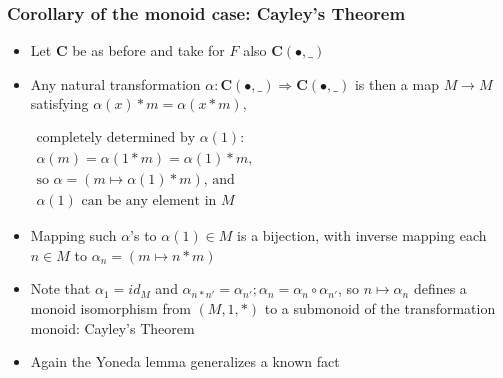 \documentclass[handout]{beamer}
\newcommand{\To}{\Rightarrow}
\newcommand{\bfsf}[1]{{\boldsymbol{#1}}}
\newcommand{\CC}{\bfsf{C}}
\begin{document}
\frame
  {   
    \frametitle{Corollary of the monoid case: Cayley's Theorem}\label{Yon:MonCayley}

 \begin{itemize}[<+->]
\item Let $\CC$ be as before and take for $F$ also $\CC(\bullet,\_)$
\item Any natural transformation $\alpha: \CC(\bullet,\_)\To \CC(\bullet,\_)$ is
then a map $M\to M$ satisfying $\alpha(x)*m = \alpha(x*m)$,
$\begin{array}{l}%
\text{completely determined by $\alpha(1)$:}\\
\text{$\alpha(m) = \alpha(1*m)   = \alpha(1)*m$,}\\
\text{so $\alpha = (m\mapsto \alpha(1)*m)$, and}\\ %
\text{$\alpha(1)$ can be any element in $M$}
\end{array}$
\item Mapping such $\alpha$'s to $\alpha(1)\in M$ is a bijection, with inverse
mapping each $n\in M$ to $\alpha_n = (m\mapsto n*m)$ %
\item Note that $\alpha_1 = id_M$ and 
$\alpha_{n*n'} = \alpha_{n'};\alpha_n= \alpha_n\circ\alpha_{n'}$, so
$n\mapsto\alpha_n$ defines a monoid isomorphism  from $(M,1,*)$
to a submonoid of the transformation monoid: Cayley's Theorem
\item Again  the Yoneda lemma generalizes a known fact
 \end{itemize}

}
\end{document}
